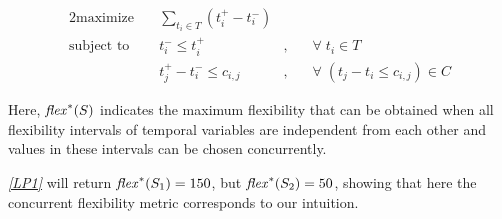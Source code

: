 \begin{alignat*}{2}\label{LP1} \tag{LP1}
\text{maximize}                      &\quad \sum_{t_i \in T}{(t^+_i - t^-_i)}  \\
\text{subject to }  &\quad  t^-_i                         \leq t^+_i  &, & \quad \forall\; t_i\in T  \\  
                            &\quad  t^+_j - t^-_i                 \leq  c_{i,j}   &, & \quad \forall\;( t_j  - t_i  \leq c_{i,j}) \in C
\end{alignat*}


Here, $\mathit{flex}^*(S)$ indicates the maximum flexibility that can be obtained when all flexibility intervals of temporal variables are independent from each other and values in these intervals can be chosen concurrently.
\begin{example}
 \emph{\ref{LP1}} will return $\mathit{flex}^*(S_1) = 150$, but $\mathit{flex}^*(S_2) = 50$, showing that here the concurrent flexibility metric corresponds to our intuition.
\end{example}

